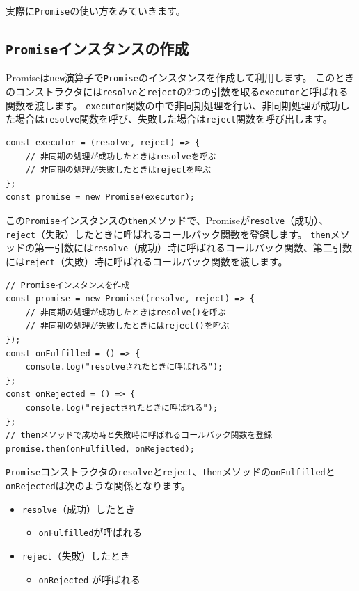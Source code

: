 実際に\texttt{Promise}の使い方をみていきます。

\hypertarget{promise-instance}{%
\subsection{\texorpdfstring{\texttt{Promise}インスタンスの作成}{Promiseインスタンスの作成}}\label{promise-instance}}

Promiseは\texttt{new}演算子で\texttt{Promise}のインスタンスを作成して利用します。
このときのコンストラクタには\texttt{resolve}と\texttt{reject}の2つの引数を取る\texttt{executor}と呼ばれる関数を渡します。
\texttt{executor}関数の中で非同期処理を行い、非同期処理が成功した場合は\texttt{resolve}関数を呼び、失敗した場合は\texttt{reject}関数を呼び出します。

\begin{lstlisting}
const executor = (resolve, reject) => {
    // 非同期の処理が成功したときはresolveを呼ぶ
    // 非同期の処理が失敗したときはrejectを呼ぶ
};
const promise = new Promise(executor);
\end{lstlisting}

この\texttt{Promise}インスタンスの\texttt{then}メソッドで、Promiseが\texttt{resolve}（成功）、\texttt{reject}（失敗）したときに呼ばれるコールバック関数を登録します。
\texttt{then}メソッドの第一引数には\texttt{resolve}（成功）時に呼ばれるコールバック関数、第二引数には\texttt{reject}（失敗）時に呼ばれるコールバック関数を渡します。

\begin{lstlisting}
// Promiseインスタンスを作成
const promise = new Promise((resolve, reject) => {
    // 非同期の処理が成功したときはresolve()を呼ぶ
    // 非同期の処理が失敗したときにはreject()を呼ぶ
});
const onFulfilled = () => {
    console.log("resolveされたときに呼ばれる");
};
const onRejected = () => {
    console.log("rejectされたときに呼ばれる");
};
// thenメソッドで成功時と失敗時に呼ばれるコールバック関数を登録
promise.then(onFulfilled, onRejected);
\end{lstlisting}

\texttt{Promise}コンストラクタの\texttt{resolve}と\texttt{reject}、\texttt{then}メソッドの\texttt{onFulfilled}と\texttt{onRejected}は次のような関係となります。

\begin{itemize}
\item
  \texttt{resolve}（成功）したとき

  \begin{itemize}
  \item
    \texttt{onFulfilled}が呼ばれる
  \end{itemize}
\item
  \texttt{reject}（失敗）したとき

  \begin{itemize}
  \item
    \texttt{onRejected} が呼ばれる
  \end{itemize}
\end{itemize}


